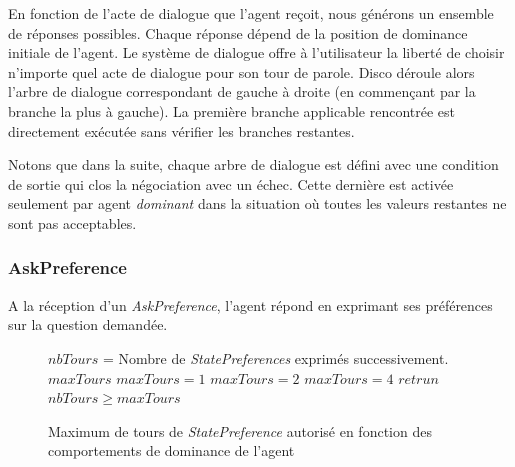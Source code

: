 	En fonction de l'acte de dialogue que l'agent reçoit, nous générons un ensemble de réponses possibles. Chaque réponse dépend de la position de dominance initiale de l'agent. Le système de dialogue offre à l'utilisateur la liberté de choisir n'importe quel acte de dialogue pour son tour de parole. Disco déroule alors l'arbre de dialogue correspondant de gauche à droite (en commençant par la branche la plus à gauche). La première branche applicable rencontrée est directement exécutée sans vérifier les branches restantes.
	
	Notons que dans la suite, chaque arbre de dialogue est défini avec une condition de sortie qui clos la négociation avec un échec. Cette dernière est activée seulement par agent \emph{dominant} dans la situation où toutes les valeurs restantes ne sont pas acceptables. 
	
	\subsubsection{AskPreference}
	A la réception d'un \emph{AskPreference}, l'agent répond en exprimant ses préférences sur la question demandée.
	

		 
		 \begin{figure}[t]
		 	\caption{\label{alg:maxtours} Maximum de tours de \emph{StatePreference} autorisé en fonction des comportements de dominance de l'agent}
		 	\begin{algorithmic}[1]
		 		\State $nbTours$ = Nombre de \emph{StatePreferences} exprimés successivement.
		 		\State $maxTours$ 
		 		\State $maxTours = 1$
		 		\EndIf
		 		 \State $maxTours = 2$
		 		\EndIf
		 		\State $maxTours = 4$
		 		\EndIf
		 		\State $retrun$ $nbTours\geq maxTours$
		 		\EndFunction
		 	\end{algorithmic}
		 \end{figure} 
		 
